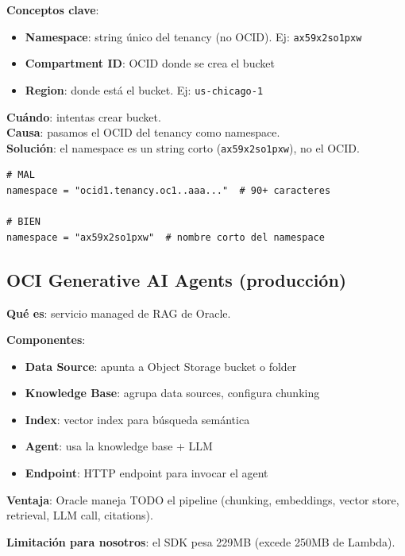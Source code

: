 \documentclass[11pt,a4paper,oneside]{article}
\newcommand{\ok}{\textcolor{okgreen}{\textbf{\checkmark}}}
\begin{document}
\textbf{Conceptos clave}:
\begin{itemize}
  \item \ok \textbf{Namespace}: string \'unico del tenancy (no OCID). Ej: \texttt{ax59x2so1pxw}
  \item \ok \textbf{Compartment ID}: OCID donde se crea el bucket
  \item \ok \textbf{Region}: donde est\'a el bucket. Ej: \texttt{us-chicago-1}
\end{itemize}

\begin{tcolorbox}[colback=errred!5!white,colframe=errred,title={Trampa \#1: namespace vs OCID}]
\textbf{Cu\'ando}: intentas crear bucket. \\
\textbf{Causa}: pasamos el OCID del tenancy como namespace. \\
\textbf{Soluci\'on}: el namespace es un string corto (\texttt{ax59x2so1pxw}), no el OCID.

\begin{lstlisting}
# MAL
namespace = "ocid1.tenancy.oc1..aaa..."  # 90+ caracteres

# BIEN
namespace = "ax59x2so1pxw"  # nombre corto del namespace
\end{lstlisting}
\end{tcolorbox}

\subsection{OCI Generative AI Agents (producci\'on)}

\textbf{Qu\'e es}: servicio managed de RAG de Oracle.

\textbf{Componentes}:
\begin{itemize}
  \item \ok \textbf{Data Source}: apunta a Object Storage bucket o folder
  \item \textbf{Knowledge Base}: agrupa data sources, configura chunking
  \item \textbf{Index}: vector index para b\'usqueda sem\'antica
  \item \textbf{Agent}: usa la knowledge base + LLM
  \item \textbf{Endpoint}: HTTP endpoint para invocar el agent
\end{itemize}

\textbf{Ventaja}: Oracle maneja TODO el pipeline (chunking, embeddings, vector store, retrieval, LLM call, citations).

\textbf{Limitaci\'on para nosotros}: el SDK pesa 229MB (excede 250MB de Lambda).
\end{document}
